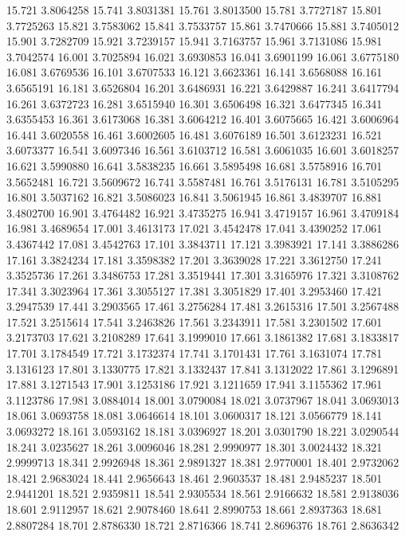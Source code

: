 15.721 3.8064258
15.741 3.8031381
15.761 3.8013500
15.781 3.7727187
15.801 3.7725263
15.821 3.7583062
15.841 3.7533757
15.861 3.7470666
15.881 3.7405012
15.901 3.7282709
15.921 3.7239157
15.941 3.7163757
15.961 3.7131086
15.981 3.7042574
16.001 3.7025894
16.021 3.6930853
16.041 3.6901199
16.061 3.6775180
16.081 3.6769536
16.101 3.6707533
16.121 3.6623361
16.141 3.6568088
16.161 3.6565191
16.181 3.6526804
16.201 3.6486931
16.221 3.6429887
16.241 3.6417794
16.261 3.6372723
16.281 3.6515940
16.301 3.6506498
16.321 3.6477345
16.341 3.6355453
16.361 3.6173068
16.381 3.6064212
16.401 3.6075665
16.421 3.6006964
16.441 3.6020558
16.461 3.6002605
16.481 3.6076189
16.501 3.6123231
16.521 3.6073377
16.541 3.6097346
16.561 3.6103712
16.581 3.6061035
16.601 3.6018257
16.621 3.5990880
16.641 3.5838235
16.661 3.5895498
16.681 3.5758916
16.701 3.5652481
16.721 3.5609672
16.741 3.5587481
16.761 3.5176131
16.781 3.5105295
16.801 3.5037162
16.821 3.5086023
16.841 3.5061945
16.861 3.4839707
16.881 3.4802700
16.901 3.4764482
16.921 3.4735275
16.941 3.4719157
16.961 3.4709184
16.981 3.4689654
17.001 3.4613173
17.021 3.4542478
17.041 3.4390252
17.061 3.4367442
17.081 3.4542763
17.101 3.3843711
17.121 3.3983921
17.141 3.3886286
17.161 3.3824234
17.181 3.3598382
17.201 3.3639028
17.221 3.3612750
17.241 3.3525736
17.261 3.3486753
17.281 3.3519441
17.301 3.3165976
17.321 3.3108762
17.341 3.3023964
17.361 3.3055127
17.381 3.3051829
17.401 3.2953460
17.421 3.2947539
17.441 3.2903565
17.461 3.2756284
17.481 3.2615316
17.501 3.2567488
17.521 3.2515614
17.541 3.2463826
17.561 3.2343911
17.581 3.2301502
17.601 3.2173703
17.621 3.2108289
17.641 3.1999010
17.661 3.1861382
17.681 3.1833817
17.701 3.1784549
17.721 3.1732374
17.741 3.1701431
17.761 3.1631074
17.781 3.1316123
17.801 3.1330775
17.821 3.1332437
17.841 3.1312022
17.861 3.1296891
17.881 3.1271543
17.901 3.1253186
17.921 3.1211659
17.941 3.1155362
17.961 3.1123786
17.981 3.0884014
18.001 3.0790084
18.021 3.0737967
18.041 3.0693013
18.061 3.0693758
18.081 3.0646614
18.101 3.0600317
18.121 3.0566779
18.141 3.0693272
18.161 3.0593162
18.181 3.0396927
18.201 3.0301790
18.221 3.0290544
18.241 3.0235627
18.261 3.0096046
18.281 2.9990977
18.301 3.0024432
18.321 2.9999713
18.341 2.9926948
18.361 2.9891327
18.381 2.9770001
18.401 2.9732062
18.421 2.9683024
18.441 2.9656643
18.461 2.9603537
18.481 2.9485237
18.501 2.9441201
18.521 2.9359811
18.541 2.9305534
18.561 2.9166632
18.581 2.9138036
18.601 2.9112957
18.621 2.9078460
18.641 2.8990753
18.661 2.8937363
18.681 2.8807284
18.701 2.8786330
18.721 2.8716366
18.741 2.8696376
18.761 2.8636342
